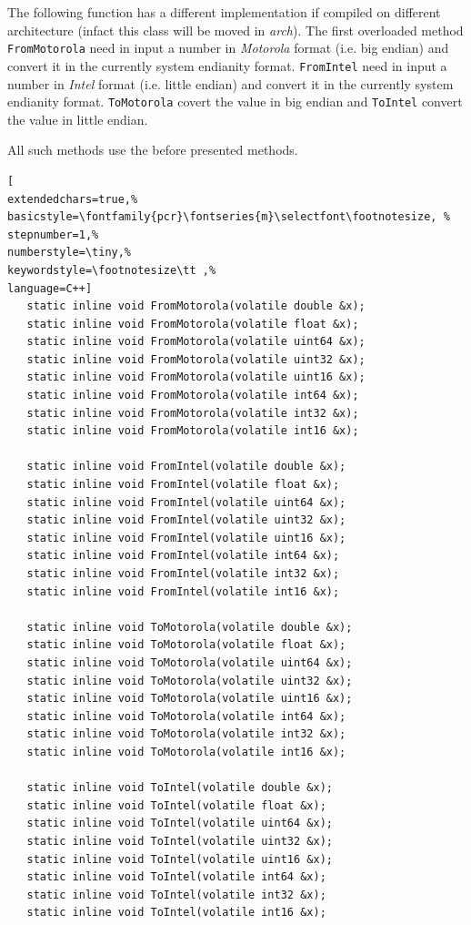 The following function has a different implementation if compiled on different architecture (infact this class will be moved in \textit{arch}). The first overloaded method \texttt{FromMotorola} need in input a number in \textit{Motorola} format (i.e. big endian) and convert it in the currently system endianity format. \texttt{FromIntel} need in input a number in \textit{Intel} format (i.e. little endian) and convert it in the currently system endianity format. \texttt{ToMotorola} covert the value in big endian and \texttt{ToIntel} convert the value in little endian.

All such methods use the before presented methods.

\begin{lstlisting}[
extendedchars=true,%
basicstyle=\fontfamily{pcr}\fontseries{m}\selectfont\footnotesize, %
stepnumber=1,%
numberstyle=\tiny,%
keywordstyle=\footnotesize\tt ,%
language=C++]
   static inline void FromMotorola(volatile double &x);
   static inline void FromMotorola(volatile float &x);
   static inline void FromMotorola(volatile uint64 &x);
   static inline void FromMotorola(volatile uint32 &x);
   static inline void FromMotorola(volatile uint16 &x);
   static inline void FromMotorola(volatile int64 &x);
   static inline void FromMotorola(volatile int32 &x);
   static inline void FromMotorola(volatile int16 &x);

   static inline void FromIntel(volatile double &x);
   static inline void FromIntel(volatile float &x);
   static inline void FromIntel(volatile uint64 &x);
   static inline void FromIntel(volatile uint32 &x);
   static inline void FromIntel(volatile uint16 &x);
   static inline void FromIntel(volatile int64 &x);
   static inline void FromIntel(volatile int32 &x);
   static inline void FromIntel(volatile int16 &x);

   static inline void ToMotorola(volatile double &x);
   static inline void ToMotorola(volatile float &x);
   static inline void ToMotorola(volatile uint64 &x);
   static inline void ToMotorola(volatile uint32 &x);
   static inline void ToMotorola(volatile uint16 &x);
   static inline void ToMotorola(volatile int64 &x);
   static inline void ToMotorola(volatile int32 &x);
   static inline void ToMotorola(volatile int16 &x);

   static inline void ToIntel(volatile double &x);
   static inline void ToIntel(volatile float &x);
   static inline void ToIntel(volatile uint64 &x);
   static inline void ToIntel(volatile uint32 &x);
   static inline void ToIntel(volatile uint16 &x);
   static inline void ToIntel(volatile int64 &x);
   static inline void ToIntel(volatile int32 &x);
   static inline void ToIntel(volatile int16 &x);
\end{lstlisting}

